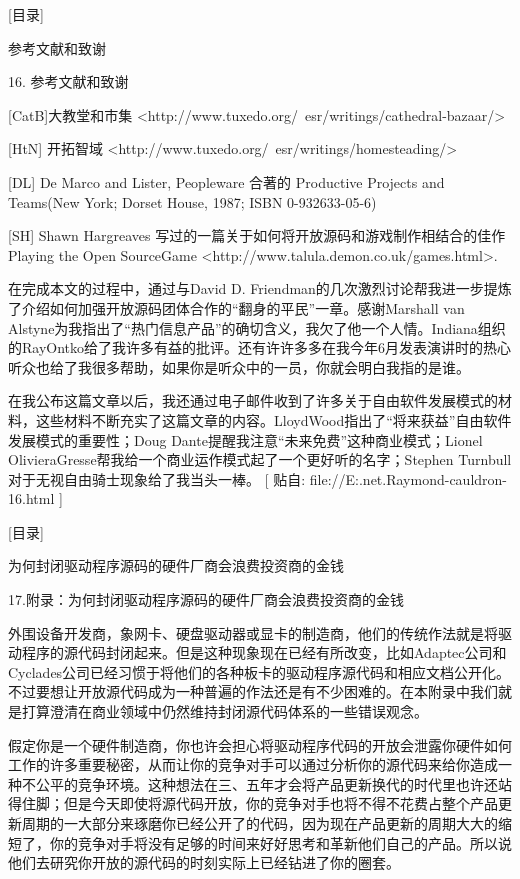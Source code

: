 \documentclass[a4paper,12pt,UTF8,twoside]{ctexbook}
\begin{document}
[目录]

参考文献和致谢

16. 参考文献和致谢

[CatB]大教堂和市集
<http://www.tuxedo.org/~esr/writings/cathedral-bazaar/>


[HtN] 开拓智域
<http://www.tuxedo.org/~esr/writings/homesteading/>


[DL] De Marco and Lister, Peopleware 合著的 Productive Projects and Teams(New York; Dorset House, 1987; ISBN 0-932633-05-6)


[SH] Shawn Hargreaves 写过的一篇关于如何将开放源码和游戏制作相结合的佳作 Playing the Open SourceGame
<http://www.talula.demon.co.uk/games.html>.


在完成本文的过程中，通过与David D. Friendman的几次激烈讨论帮我进一步提炼了介绍如何加强开放源码团体合作的“翻身的平民”一章。感谢Marshall van Alstyne为我指出了“热门信息产品”的确切含义，我欠了他一个人情。Indiana组织的RayOntko给了我许多有益的批评。还有许许多多在我今年6月发表演讲时的热心听众也给了我很多帮助，如果你是听众中的一员，你就会明白我指的是谁。


在我公布这篇文章以后，我还通过电子邮件收到了许多关于自由软件发展模式的材料，这些材料不断充实了这篇文章的内容。LloydWood指出了“将来获益”自由软件发展模式的重要性；Doug Dante提醒我注意“未来免费”这种商业模式；Lionel OlivieraGresse帮我给一个商业运作模式起了一个更好听的名字；Stephen Turnbull对于无视自由骑士现象给了我当头一棒。
[ 贴自: file://E:\joyfire\joyfire.net\bible\Eric.Raymond\magic-cauldron-16.html ]

[目录]

为何封闭驱动程序源码的硬件厂商会浪费投资商的金钱

17.附录：为何封闭驱动程序源码的硬件厂商会浪费投资商的金钱

外围设备开发商，象网卡、硬盘驱动器或显卡的制造商，他们的传统作法就是将驱动程序的源代码封闭起来。但是这种现象现在已经有所改变，比如Adaptec公司和Cyclades公司已经习惯于将他们的各种板卡的驱动程序源代码和相应文档公开化。不过要想让开放源代码成为一种普遍的作法还是有不少困难的。在本附录中我们就是打算澄清在商业领域中仍然维持封闭源代码体系的一些错误观念。


假定你是一个硬件制造商，你也许会担心将驱动程序代码的开放会泄露你硬件如何工作的许多重要秘密，从而让你的竞争对手可以通过分析你的源代码来给你造成一种不公平的竞争环境。这种想法在三、五年才会将产品更新换代的时代里也许还站得住脚；但是今天即使将源代码开放，你的竞争对手也将不得不花费占整个产品更新周期的一大部分来琢磨你已经公开了的代码，因为现在产品更新的周期大大的缩短了，你的竞争对手将没有足够的时间来好好思考和革新他们自己的产品。所以说他们去研究你开放的源代码的时刻实际上已经钻进了你的圈套。
\end{document}
